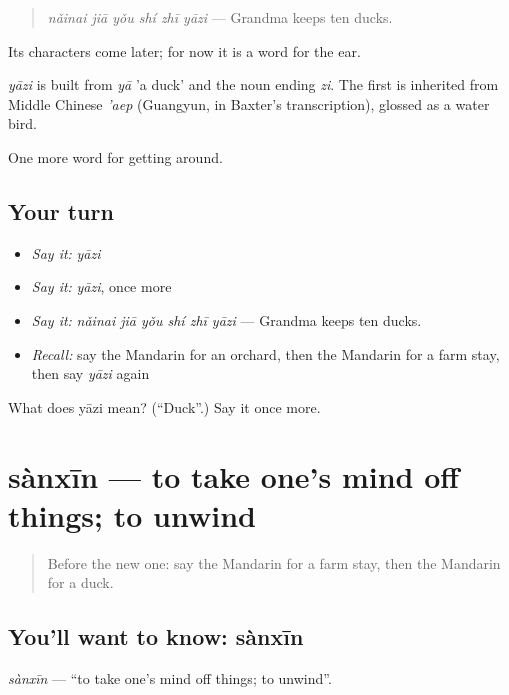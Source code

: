 \begin{quote}
\emph{nǎinai jiā yǒu shí zhī yāzi} — Grandma keeps ten ducks.
\end{quote}

Its characters come later; for now it is a word for the ear.

\begin{cousinweb}
\emph{yāzi} is built from \emph{yā} 'a duck' and the noun ending \emph{zi}. The first is inherited from Middle Chinese \emph{'aep} (Guangyun, in Baxter's transcription), glossed as a water bird.
\end{cousinweb}

\begin{grammarlens}[title={What you've built}]
One more word for getting around.
\end{grammarlens}

\subsection*{Your turn}
\begin{itemize}
\raggedright
  \item \emph{Say it:} \emph{yāzi}
  \item \emph{Say it:} \emph{yāzi}, once more
  \item \emph{Say it:} \emph{nǎinai jiā yǒu shí zhī yāzi} — Grandma keeps ten ducks.
  \item \emph{Recall:} say the Mandarin for an orchard, then the Mandarin for a farm stay, then say \emph{yāzi} again
\end{itemize}

\begin{tcolorbox}[breakable,colback=teal!4,colframe=teal!35!black,title={Before you move on}]
What does yāzi mean? (\textquotedblleft{}Duck\textquotedblright{}.) Say it once more.
\end{tcolorbox}
\section[sànxīn]{sànxīn — to take one's mind off things; to unwind}

\label{lesson:ZH-C439-sanxin}



\begin{quote}
Before the new one: say the Mandarin for a farm stay, then the Mandarin for a duck.
\end{quote}

\subsection*{You'll want to know: sànxīn}
\emph{sànxīn} — \textquotedblleft{}to take one's mind off things; to unwind\textquotedblright{}.

